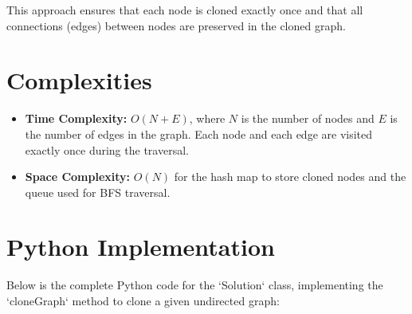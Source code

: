 This approach ensures that each node is cloned exactly once and that all connections (edges) between nodes are preserved in the cloned graph.


\section*{Complexities}

\begin{itemize}
	\item \textbf{Time Complexity:} \( O(N + E) \), where \( N \) is the number of nodes and \( E \) is the number of edges in the graph. Each node and each edge are visited exactly once during the traversal.
	\item \textbf{Space Complexity:} \( O(N) \) for the hash map to store cloned nodes and the queue used for BFS traversal.
\end{itemize}

\newpage %
\section*{Python Implementation}


Below is the complete Python code for the `Solution` class, implementing the `cloneGraph` method to clone a given undirected graph:

